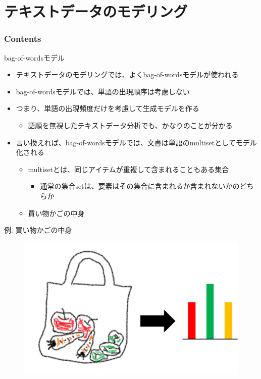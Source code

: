 \documentclass[aspectratio=169,unicode,dvipdfmx,14pt]{beamer}
\begin{document}
\section{テキストデータのモデリング}

\begin{frame}\frametitle{Contents}
\Large \tableofcontents[currentsection]
\end{frame}

\begin{frame}{bag-of-wordsモデル}
\begin{itemize}
\item テキストデータのモデリングでは、よくbag-of-wordsモデルが使われる
\item bag-of-wordsモデルでは、単語の出現順序は考慮しない
\item つまり、単語の出現頻度だけを考慮して生成モデルを作る
\begin{itemize}
\item 語順を無視したテキストデータ分析でも、かなりのことが分かる
\end{itemize}
\item 言い換えれば、bag-of-wordsモデルでは、文書は単語のmultisetとしてモデル化される
\begin{itemize}
\item multisetとは、同じアイテムが重複して含まれることもある集合
\begin{itemize}
\item 通常の集合setは、要素はその集合に含まれるか含まれないかのどちらか
\end{itemize}
\item[例.]  買い物かごの中身
\end{itemize}
\end{itemize}
\end{frame}

\begin{frame}{例. 買い物かごの中身}
\begin{figure}[htbp]
\begin{center}
\includegraphics[scale=0.14]{bagofwords.png}
\label{}
\end{center}
\end{figure}
\end{frame}
\end{document}
